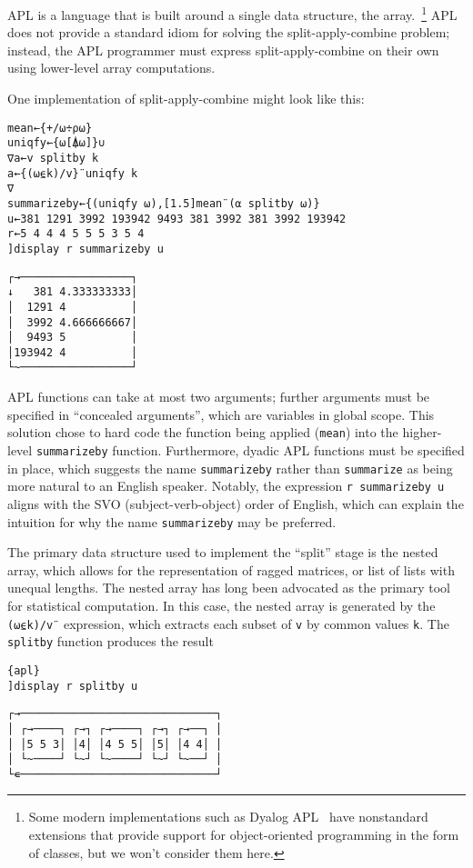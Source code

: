 \documentclass[11pt]{asaproc}
\begin{document}
APL is a language that is built around a single data structure, the
array.~\footnote{Some modern implementations such as Dyalog APL~\citep{dyalog15}
have nonstandard extensions that provide support for object-oriented
programming in the form of classes, but we won't consider them here.} APL does
not provide a standard idiom for solving the split-apply-combine problem;
instead, the APL programmer must express split-apply-combine on their own using
lower-level array computations.

One implementation of split-apply-combine might look like this:

\begin{lstlisting}[language=apl]
mean←{+/⍵÷⍴⍵}
uniqfy←{⍵[⍋⍵]}∪
∇a←v splitby k
a←{(⍵⍷k)/v}¨uniqfy k
∇
summarizeby←{(uniqfy ⍵),[1.5]mean¨(⍺ splitby ⍵)}
u←381 1291 3992 193942 9493 381 3992 381 3992 193942
r←5 4 4 4 5 5 5 3 5 4
]display r summarizeby u
\end{lstlisting}
\begin{verbatim}
┌→─────────────────┐
↓   381 4.333333333│
│  1291 4          │
│  3992 4.666666667│
│  9493 5          │
│193942 4          │
└~─────────────────┘
\end{verbatim}

APL functions can take at most two arguments; further arguments must be
specified in ``concealed arguments'', which are variables in global scope.
This solution chose to hard code the function being applied (\lstinline|mean|)
into the higher-level \lstinline|summarizeby| function. Furthermore, dyadic APL
functions must be specified in place, which suggests the name
\lstinline|summarizeby| rather than \lstinline|summarize| as being more natural
to an English speaker. Notably, the expression \lstinline|r summarizeby u|
aligns with the SVO (subject-verb-object) order of English, which can explain
the intuition for why the name \lstinline|summarizeby| may be preferred.

The primary data structure used to implement the ``split'' stage is the nested
array, which allows for the representation of ragged matrices, or list of lists
with unequal lengths. The nested array has long been advocated as the primary
tool for statistical computation\citep{Anscombe1981,Friendly1994}. In this case,
the nested array is generated by the \lstinline|(⍵⍷k)/v¨| expression, which
extracts each subset of \lstinline|v| by common values \lstinline|k|. The
\lstinline|splitby| function produces the result

\begin{lstlisting}{apl}
]display r splitby u
\end{lstlisting}
\begin{verbatim}
┌→──────────────────────────────┐
│ ┌→────┐ ┌→┐ ┌→────┐ ┌→┐ ┌→──┐ │
│ │5 5 3│ │4│ │4 5 5│ │5│ │4 4│ │
│ └~────┘ └~┘ └~────┘ └~┘ └~──┘ │
└∊──────────────────────────────┘
\end{verbatim}
\end{document}
